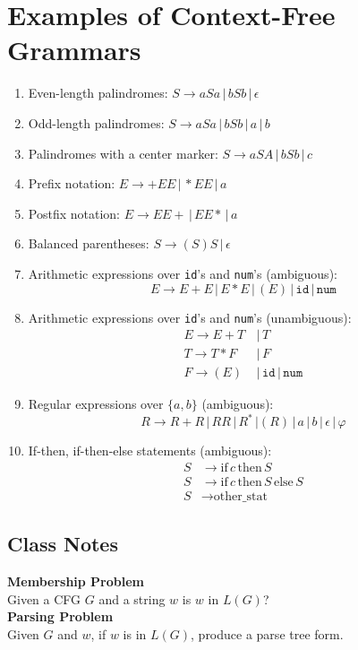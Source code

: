 \documentclass[]{article}
\begin{document}
\section{Examples of Context-Free Grammars}
  \begin{enumerate}
    \item Even-length palindromes: $S \rightarrow aSa \, | \, bSb \, | \, 
    \epsilon$
    \item Odd-length palindromes: $S \rightarrow aSa \, | \, bSb \, | \, a \, | 
    \, b$
    \item Palindromes with a center marker: $S \rightarrow aSA \, | \, bSb \, | 
    \, c$
    \item Prefix notation: $E \rightarrow  + E E \, | \, * E E \, | \, a$
    \item Postfix notation: $E \rightarrow E E + \, | \, E E * \, | \, a$
    \item Balanced parentheses: $S \rightarrow ( S ) S \, | \, \epsilon$
    \item Arithmetic expressions over \texttt{id}'s and \texttt{num}'s 
    (ambiguous):
      \[
         E \rightarrow E + E \, | \, E * E \, | \, (E) \, | \, \texttt{id} \, | 
        \, \texttt{num} 
      \]
    \item Arithmetic expressions over \texttt{id}'s and \texttt{num}'s 
    (unambiguous):
      \begin{align*}
        E \rightarrow E + T \, &| \, T \\
        T \rightarrow T * F \, &| \, F \\
        F \rightarrow ( E ) \, &| \, \texttt{id} \, | \,  \texttt{num}
      \end{align*}
    \item Regular expressions over $\{ a, b \}$ (ambiguous):
      \[
         R \rightarrow R + R \, | \, RR \, | \, R^* \, | (R) \, | \, a \, | \, b 
        \, | \, \epsilon \, | \, \varphi
      \]
    \item If-then, if-then-else statements (ambiguous):
      \begin{align*}
        S &\rightarrow \text{if} \, c \, \text{then} \, S                     \\
        S &\rightarrow \text{if} \, c \, \text{then} \, S \, \text{else} \, S \\
        S &\rightarrow \text{other\_stat}
      \end{align*}
  \end{enumerate}
  \subsection*{Class Notes}
    \textbf{Membership Problem} \\
    Given a CFG $G$ and a string $w$ is $w$ in $L(G)$? \\
    \textbf{Parsing Problem} \\
    Given $G$ and $w$, if $w$ is in $L(G)$, produce a parse tree form.
  
\end{document}
